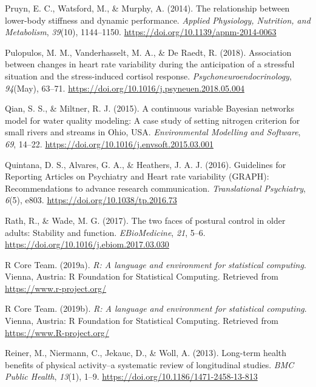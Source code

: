 \documentclass[man,floatsintext]{apa6}
\begin{document}
\leavevmode\hypertarget{ref-Pruyn2014}{}%
Pruyn, E. C., Watsford, M., \& Murphy, A. (2014). The relationship between lower-body stiffness and dynamic performance. \emph{Applied Physiology, Nutrition, and Metabolism}, \emph{39}(10), 1144--1150. \url{https://doi.org/10.1139/apnm-2014-0063}

\leavevmode\hypertarget{ref-Pulopulos2018}{}%
Pulopulos, M. M., Vanderhasselt, M. A., \& De Raedt, R. (2018). Association between changes in heart rate variability during the anticipation of a stressful situation and the stress-induced cortisol response. \emph{Psychoneuroendocrinology}, \emph{94}(May), 63--71. \url{https://doi.org/10.1016/j.psyneuen.2018.05.004}

\leavevmode\hypertarget{ref-Qian2015}{}%
Qian, S. S., \& Miltner, R. J. (2015). A continuous variable Bayesian networks model for water quality modeling: A case study of setting nitrogen criterion for small rivers and streams in Ohio, USA. \emph{Environmental Modelling and Software}, \emph{69}, 14--22. \url{https://doi.org/10.1016/j.envsoft.2015.03.001}

\leavevmode\hypertarget{ref-Quintana2016a}{}%
Quintana, D. S., Alvares, G. A., \& Heathers, J. A. J. (2016). Guidelines for Reporting Articles on Psychiatry and Heart rate variability (GRAPH): Recommendations to advance research communication. \emph{Translational Psychiatry}, \emph{6}(5), e803. \url{https://doi.org/10.1038/tp.2016.73}

\leavevmode\hypertarget{ref-Rath2017}{}%
Rath, R., \& Wade, M. G. (2017). The two faces of postural control in older adults: Stability and function. \emph{EBioMedicine}, \emph{21}, 5--6. \url{https://doi.org/10.1016/j.ebiom.2017.03.030}

\leavevmode\hypertarget{ref-RCoreTeam2019}{}%
R Core Team. (2019a). \emph{R: A language and environment for statistical computing}. Vienna, Austria: R Foundation for Statistical Computing. Retrieved from \url{https://www.r-project.org/}

\leavevmode\hypertarget{ref-R-base}{}%
R Core Team. (2019b). \emph{R: A language and environment for statistical computing}. Vienna, Austria: R Foundation for Statistical Computing. Retrieved from \url{https://www.R-project.org/}

\leavevmode\hypertarget{ref-Reiner2013}{}%
Reiner, M., Niermann, C., Jekauc, D., \& Woll, A. (2013). Long-term health benefits of physical activity--a systematic review of longitudinal studies. \emph{BMC Public Health}, \emph{13}(1), 1--9. \url{https://doi.org/10.1186/1471-2458-13-813}
\end{document}
